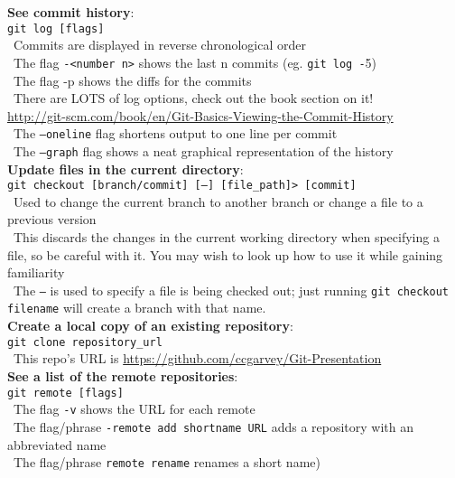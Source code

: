 \documentclass[12pt]{article}
\begin{document}
{{\bf See commit history}:\\
\texttt{git log [flags]}\\
\textbullet\, Commits are displayed in reverse chronological order\\
\textbullet\, The flag \texttt{-<number n>} shows the last n commits (eg. \texttt{git log -}5)\\
\textbullet\, The flag -p shows the diffs for the commits\\
\textbullet\, There are LOTS of log options, check out the book section on it!\\ \url{http://git-scm.com/book/en/Git-Basics-Viewing-the-Commit-History}\\
\textbullet\, The \texttt{--oneline} flag shortens output to one line per commit\\
\textbullet\, The \texttt{--graph} flag shows a neat graphical representation of the history\\

{\bf Update files in the current directory}:\\
\texttt{git checkout [branch/commit] [--] [file{\_}path]> [commit]}\\
\textbullet\, Used to change the current branch to another branch or change a file to a previous version\\
\textbullet\, This discards the changes in the current working directory when specifying a file, so be careful with it. You may wish to look up how to use it while gaining familiarity\\
\textbullet\, The \texttt{--} is used to specify a file is being checked out; just running \texttt{git checkout filename} will create a branch with that name.\\
    
{\bf Create a local copy of an existing repository}:\\
\texttt{git clone repository{\_}url}\\
\textbullet\, This repo's URL is \url{https://github.com/ccgarvey/Git-Presentation}\\

{\bf See a list of the remote repositories}:\\
\texttt{git remote [flags]}\\
\textbullet\, The flag \texttt{-v} shows the URL for each remote\\
\textbullet\, The flag/phrase \texttt{-remote add shortname URL} adds a repository with an abbreviated name\\
\textbullet\, The flag/phrase \texttt{remote rename} renames a short name)\\

}
\end{document}
